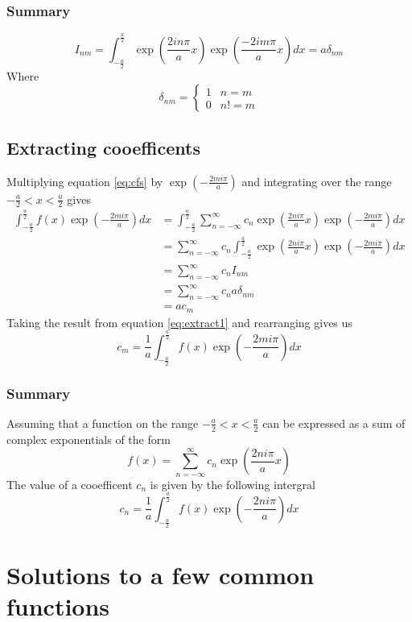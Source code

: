 \documentclass[11pt,twoside,a4paper]{book}
\begin{document}
\subsection{Summary}
\begin{mdframed}
\begin{equation*}
I_{nm} = \int_{-\frac{a}{2}}^{\frac{a}{2}} \exp \left( \frac{2 i n \pi}{a} x\right) \exp \left( \frac{-2 i m \pi}{a} x\right) dx = a \delta_{nm}
\end{equation*}
Where
\begin{equation*}
\delta_{nm} = \left\{
  \begin{array}{lr}
    1 & n = m\\
    0 & n != m
  \end{array}
\right.
\end{equation*}
\end{mdframed}
\section{Extracting cooefficents}
Multiplying equation \ref{eq:cfs} by $\exp\left(-\frac{2mi\pi}{a}\right)$ and
integrating over the range $-\frac{a}{2}<x<\frac{a}{2}$ gives
\begin{subequations}
  \label{eq:extract1}
\begin{align}
\label{eq:cfs2}
\int_{-\frac{a}{2}}^{\frac{a}{2}} f(x) \exp\left(-\frac{2mi\pi}{a}\right) dx &= \int_{-\frac{a}{2}}^{\frac{a}{2}} \sum_{n=-\infty}^{\infty} c_n \exp\left(\frac{2ni\pi}{a}x\right) \exp\left(-\frac{2mi\pi}{a}\right) dx \\
&=\sum_{n=-\infty}^{\infty} c_n \int_{-\frac{a}{2}}^{\frac{a}{2}} \exp\left(\frac{2ni\pi}{a}x\right) \exp\left(-\frac{2mi\pi}{a}\right) dx \\
&=\sum_{n=-\infty}^{\infty} c_n I_{nm} \\
&=\sum_{n=-\infty}^{\infty} c_n a \delta_{nm} \\
&= a c_m
\end{align}
\end{subequations}
Taking the result from equation \ref{eq:extract1} and rearranging gives us
\begin{equation}
c_m = \frac{1}{a}\int_{-\frac{a}{2}}^{\frac{a}{2}} f(x) \exp\left(-\frac{2mi\pi}{a}\right) dx
\end{equation}
\newpage
\subsection{Summary}
\begin{mdframed}
Assuming that a function on the range $-\frac{a}{2}<x<\frac{a}{2}$ can be expressed
as a sum of complex exponentials of the form
\begin{equation*}
f(x)=\sum_{n=-\infty}^{\infty} c_n \exp\left(\frac{2ni\pi}{a}x\right)
\end{equation*}
The value of a cooefficent $c_n$ is given by the following intergral
\begin{equation*}
c_n = \frac{1}{a}\int_{-\frac{a}{2}}^{\frac{a}{2}} f(x) \exp\left(-\frac{2ni\pi}{a}\right) dx
\end{equation*}
\end{mdframed}

\chapter{Solutions to a few common functions}
\end{document}
